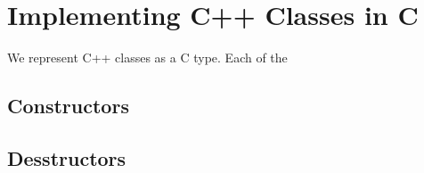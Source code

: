 \section{Implementing C++ Classes in C}

We represent C++ classes as a C  type.  Each
of the 

\subsection{Constructors}

\subsection{Desstructors}


